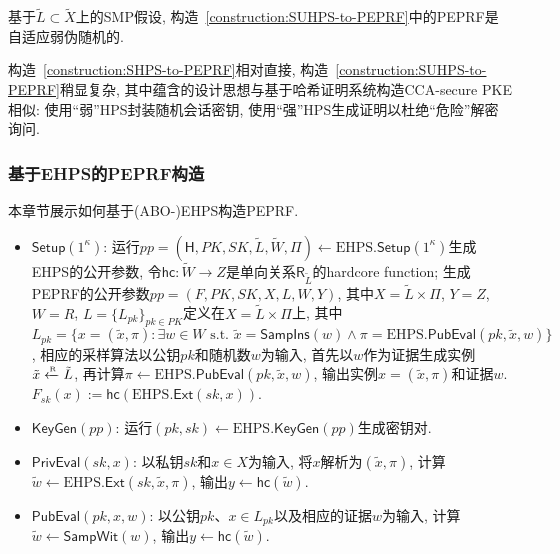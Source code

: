 \begin{theorem}\label{theorem:HPS-to-APEPRF}
    基于$\tilde{L} \subset \tilde{X}$上的SMP假设, 构造~\ref{construction:SUHPS-to-PEPRF}中的PEPRF是自适应弱伪随机的.
\end{theorem}


\begin{remark}
构造~\ref{construction:SHPS-to-PEPRF}相对直接, 构造~\ref{construction:SUHPS-to-PEPRF}稍显复杂, 
其中蕴含的设计思想与基于哈希证明系统构造CCA-secure PKE相似: 使用``弱''HPS封装随机会话密钥, 
使用``强''HPS生成证明以杜绝``危险''解密询问.       
\end{remark}

\subsubsection{基于EHPS的PEPRF构造}
本章节展示如何基于(ABO-)EHPS构造PEPRF.
\begin{construction}\label{construction:EHPS-based-PEPRF}
\begin{itemize}
\item $\mathsf{Setup}(1^\kappa)$: 运行$pp = (\mathsf{H}, PK, SK, \tilde{L}, \tilde{W}, \Pi) 
    \leftarrow \text{EHPS}.\mathsf{Setup}(1^\kappa)$生成EHPS的公开参数, 
    令$\mathsf{hc}: \tilde{W} \rightarrow Z$是单向关系$\mathsf{R}_{\tilde{L}}$的hardcore function; 
    生成PEPRF的公开参数$pp = (F, PK, SK, X, L, W, Y)$, 其中$X = \tilde{L} \times \Pi$, $Y = Z$, $W = R$, 
    $L = \{L_{pk}\}_{pk \in PK}$定义在$X = \tilde{L} \times \Pi$上, 
    其中$L_{pk} = \{x = (\tilde{x}, \pi): \exists w \in W \text{~s.t.~} \tilde{x} = \mathsf{SampIns}(w) 
    \wedge \pi = \text{EHPS}.\mathsf{PubEval}(pk, \tilde{x}, w)\}$, 
    相应的采样算法以公钥$pk$和随机数$w$为输入, 首先以$w$作为证据生成实例$\tilde{x} \xleftarrow{\textup{\tiny R}} \tilde{L}$, 
    再计算$\pi \leftarrow \text{EHPS}.\mathsf{PubEval}(pk, \tilde{x}, w)$, 输出实例$x = (\tilde{x}, \pi)$和证据$w$. 
    $F_{sk}(x):= \mathsf{hc}(\text{EHPS}.\mathsf{Ext}(sk, x))$.   

\item $\mathsf{KeyGen}(pp)$: 运行$(pk, sk) \leftarrow \text{EHPS}.\mathsf{KeyGen}(pp)$生成密钥对. 

\item $\mathsf{PrivEval}(sk, x)$: 以私钥$sk$和$x \in X$为输入, 将$x$解析为$(\tilde{x}, \pi)$, 
    计算$\tilde{w} \leftarrow \text{EHPS}.\mathsf{Ext}(sk, \tilde{x}, \pi)$, 
    输出$y \leftarrow \mathsf{hc}(\tilde{w})$.   

\item $\mathsf{PubEval}(pk, x, w)$: 以公钥$pk$、$x \in L_{pk}$以及相应的证据$w$为输入,  
    计算$\tilde{w} \leftarrow \mathsf{SampWit}(w)$, 输出$y \leftarrow \mathsf{hc}(\tilde{w})$.   
\end{itemize}
\end{construction} 

